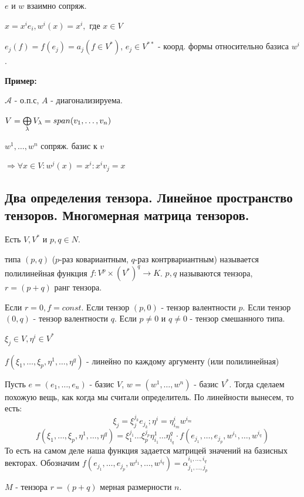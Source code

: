 $e \text{ и }w$ взаимно сопряж.

$x=x^ie_i, w^i(x)=x^i,$ где $x \in V$

$e_j(f)=f(e_j)=a_j(f \in V^*)$, $e_j \in V^{**}$ - коорд. формы относительно базиса $w^i$.



\textbf{Пример:}

$\mathcal{A}$ - о.п.с, $A$ - диагонализируема.

$V = \bigoplus\limits_{\lambda}V_{\lambda} = span (v_1,\ldots,v_n)$

$w^1,\ldots,w^n$ сопряж. базис к $v$  %

$\Rightarrow \forall x \in V: w^j(x) =x^i: x^iv_j = x$

\newpage
\subsection{Два определения тензора. Линейное пространство тензоров. Многомерная матрица тензоров.}

 Есть $V,V^*$ и $p,q \in N$.

 типа $(p,q)$ ($p$-раз ковариантным, $q$-раз контрвариантным) называется полилинейная функция $f: V^p\times (V^*)^q \rightarrow K$. $p,q$ называются  тензора, $r = (p+q)$ ранг тензора.

Если $r = 0, f = const$. Если тензор $(p,0) $ -  тензор валентности $p$. Если тензор $(0,q)$ -  тензор валентности $q$. Если $p\neq 0 $ и $q\neq 0$ - тензор смешанного типа.

$\xi_j \in V, \eta^i \in V^*$

$f(\xi_1,\ldots,\xi_p,\eta^1,\ldots, \eta^q)$ - линейно по каждому аргументу (или полилинейная)

Пусть $e = (e_1,\ldots, e_n)$ - базис $V$, $w = (w^1,\ldots, w^n)$ - базис $V^*$. Тогда сделаем похожую вещь, как когда мы считали определитель. По линейности вынесем, то есть:
$$\xi_j = \xi_j^{j_k}e_{j_k};\eta^i = \eta_{i_m}^iw^{i_m}$$
$$f(\xi_1,\ldots,\xi_p,\eta^1,\ldots, \eta^q) = \xi_1^{j_1}\ldots\xi_p^{j_p}\eta_{i_1}^1 \ldots \eta^q_{i_q} \cdot f(e_{j_1},\ldots, e_{j_p},w^{i_1},\ldots, w^{i_q})$$
То есть  на самом деле наша функция задается матрицей значений на базисных векторах. Обозначим $f(e_{j_1},\ldots, e_{j_p},w^{i_1},\ldots, w^{i_q}) = \alpha_{j_1,\ldots,j_p}^{i_1,\ldots,i_q}$

 $M$ -  тензора $r = (p+q)$ мерная размерности $n$.


